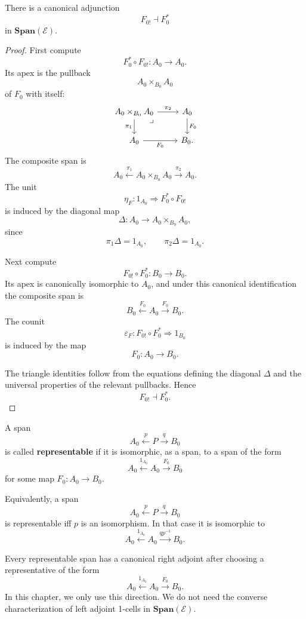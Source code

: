 \begin{proposition}
\label{prop:canonical-span-adjunction}
There is a canonical adjunction
\[
F_{0!}\dashv F_0^\ast
\]
in \(\mathbf{Span}(\mathcal E)\).
\end{proposition}

\begin{proof}
First compute
\[
F_0^\ast\circ F_{0!}:A_0\to A_0.
\]
Its apex is the pullback
\[
A_0\times_{B_0}A_0
\]
of \(F_0\) with itself:
\[
\begin{tikzcd}
A_0\times_{B_0}A_0
\arrow[r, "\pi_2"]
\arrow[d, "\pi_1"']
\arrow[dr, phantom, "\lrcorner", very near start]
&
A_0 \arrow[d, "F_0"]
\\
A_0 \arrow[r, "F_0"'] & B_0.
\end{tikzcd}
\]
The composite span is
\[
A_0
\xleftarrow{\pi_1}
A_0\times_{B_0}A_0
\xrightarrow{\pi_2}
A_0.
\]
The unit
\[
\eta_F:1_{A_0}\Rightarrow F_0^\ast\circ F_{0!}
\]
is induced by the diagonal map
\[
\Delta:A_0\to A_0\times_{B_0}A_0,
\]
since
\[
\pi_1\Delta=1_{A_0},
\qquad
\pi_2\Delta=1_{A_0}.
\]

Next compute
\[
F_{0!}\circ F_0^\ast:B_0\to B_0.
\]
Its apex is canonically isomorphic to \(A_0\), and under this canonical identification the composite span is
\[
B_0\xleftarrow{F_0}A_0\xrightarrow{F_0}B_0.
\]
The counit
\[
\varepsilon_F:F_{0!}\circ F_0^\ast\Rightarrow 1_{B_0}
\]
is induced by the map
\[
F_0:A_0\to B_0.
\]

The triangle identities follow from the equations defining the diagonal \(\Delta\) and the universal properties of the relevant pullbacks. Hence
\[
F_{0!}\dashv F_0^\ast.
\]
\end{proof}

\begin{definition}
\label{def:representable-span}
A span
\[
A_0\xleftarrow{p}P\xrightarrow{q}B_0
\]
is called \textbf{representable} if it is isomorphic, as a span, to a span of the form
\[
A_0
\xleftarrow{1_{A_0}}
A_0
\xrightarrow{F_0}
B_0
\]
for some map \(F_0:A_0\to B_0\).
\end{definition}

Equivalently, a span
\[
A_0\xleftarrow{p}P\xrightarrow{q}B_0
\]
is representable iff \(p\) is an isomorphism. In that case it is isomorphic to
\[
A_0\xleftarrow{1_{A_0}}A_0\xrightarrow{q p^{-1}}B_0.
\]

\begin{remark}
\label{rem:representable-versus-left-adjoint}
Every representable span has a canonical right adjoint after choosing a representative of the form
\[
A_0\xleftarrow{1_{A_0}}A_0\xrightarrow{F_0}B_0.
\]
In this chapter, we only use this direction. We do not need the converse characterization of left adjoint 1-cells in \(\mathbf{Span}(\mathcal E)\).
\end{remark}

